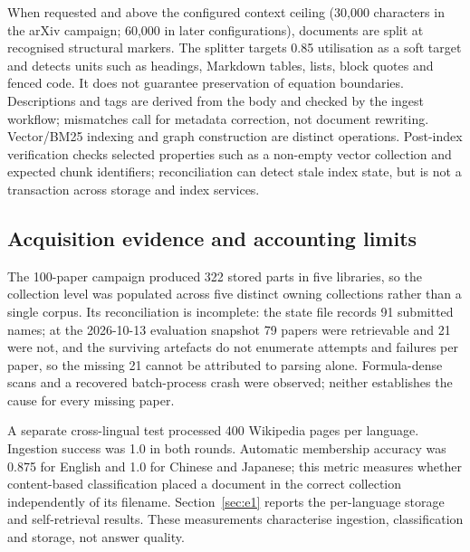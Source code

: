 When requested and above the configured context ceiling (30,000 characters in
the arXiv campaign; 60,000 in later configurations), documents are split at
recognised structural markers. The splitter targets 0.85 utilisation as a
soft target and detects units such as headings, Markdown tables, lists, block
quotes and fenced code. It does not guarantee preservation of equation
boundaries. Descriptions and tags are derived from the body and checked by the
ingest workflow; mismatches call for metadata correction, not document
rewriting.
Vector/BM25 indexing and graph construction are distinct operations.
Post-index verification checks selected properties such as a non-empty vector
collection and expected chunk identifiers; reconciliation can detect stale
index state, but is not a transaction across storage and index services.

\subsection{Acquisition evidence and accounting limits}

The 100-paper campaign produced 322 stored parts in five libraries, so the
collection level was populated across five distinct owning collections rather
than a single corpus.
Its reconciliation is incomplete: the state file records 91 submitted names;
at the 2026-10-13 evaluation snapshot 79 papers were retrievable and 21 were
not, and
the surviving artefacts do not enumerate attempts and failures per paper, so
the missing 21 cannot be attributed to parsing alone. Formula-dense scans and
a recovered batch-process crash were observed; neither establishes the cause
for every missing paper.

A separate cross-lingual test processed 400 Wikipedia pages per language.
Ingestion success was 1.0 in both rounds. Automatic membership accuracy was
0.875 for English and 1.0 for Chinese and Japanese; this metric measures
whether content-based classification placed a document in the correct
collection independently of its filename. Section~\ref{sec:e1} reports the
per-language storage and self-retrieval results. These measurements
characterise ingestion, classification and storage, not answer quality.
